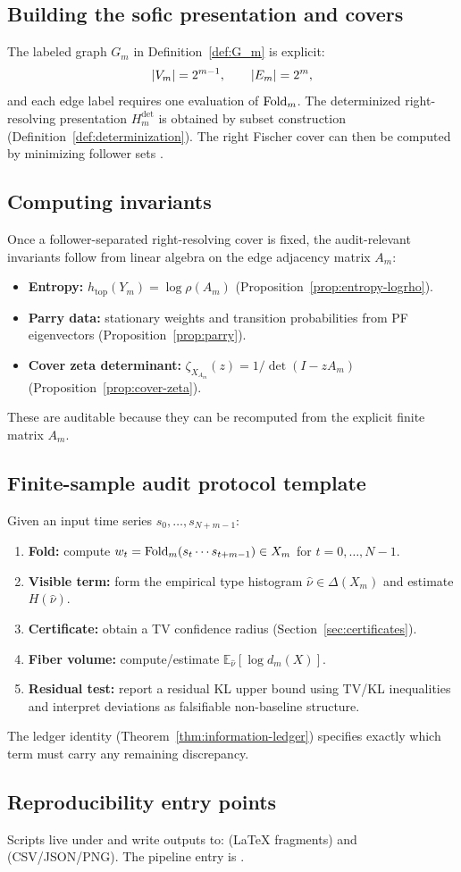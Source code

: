 \subsection{Building the sofic presentation and covers}\label{subsec:algo-graph}
The labeled graph $G_m$ in Definition~\ref{def:G_m} is explicit:
\[
\left\lvert V_m\right\rvert=2^{m-1},\qquad \left\lvert E_m\right\rvert=2^m,
\]
and each edge label requires one evaluation of $\mathrm{Fold}_m$.
The determinized right-resolving presentation $H_m^{\mathrm{det}}$ is obtained by subset construction (Definition~\ref{def:determinization}).
The right Fischer cover can then be computed by minimizing follower sets \cite{LindMarcus1995,Kitchens1998SymbolicDynamics}.

\subsection{Computing invariants}\label{subsec:algo-invariants}
Once a follower-separated right-resolving cover is fixed, the audit-relevant invariants follow from linear algebra on the edge adjacency matrix $A_m$:
\begin{itemize}
  \item \textbf{Entropy:} $h_{\mathrm{top}}(Y_m)=\log\rho(A_m)$ (Proposition~\ref{prop:entropy-logrho}).
  \item \textbf{Parry data:} stationary weights and transition probabilities from PF eigenvectors (Proposition~\ref{prop:parry}).
  \item \textbf{Cover zeta determinant:} $\zeta_{X_{A_m}}(z)=1/\det(I-zA_m)$ (Proposition~\ref{prop:cover-zeta}).
\end{itemize}
These are auditable because they can be recomputed from the explicit finite matrix $A_m$.

\subsection{Finite-sample audit protocol template}\label{subsec:algo-protocol}
Given an input time series $s_0,\dots,s_{N+m-1}$:
\begin{enumerate}
  \item \textbf{Fold:} compute $w_t=\mathrm{Fold}_m(s_t\cdots s_{t+m-1})\in X_m$ for $t=0,\dots,N-1$.
  \item \textbf{Visible term:} form the empirical type histogram $\hat{\nu}\in\Delta(X_m)$ and estimate $H(\hat{\nu})$.
  \item \textbf{Certificate:} obtain a TV confidence radius (Section~\ref{sec:certificates}).
  \item \textbf{Fiber volume:} compute/estimate $\mathbb{E}_{\hat{\nu}}[\log d_m(X)]$.
  \item \textbf{Residual test:} report a residual KL upper bound using TV/KL inequalities \cite{SasonVerdu2016fDivergence} and interpret deviations as falsifiable non-baseline structure.
\end{enumerate}
The ledger identity (Theorem~\ref{thm:information-ledger}) specifies exactly which term must carry any remaining discrepancy.

\subsection{Reproducibility entry points}\label{subsec:algo-repro}
Scripts live under  and write outputs to:
 (LaTeX fragments) and  (CSV/JSON/PNG).
The pipeline entry is .

